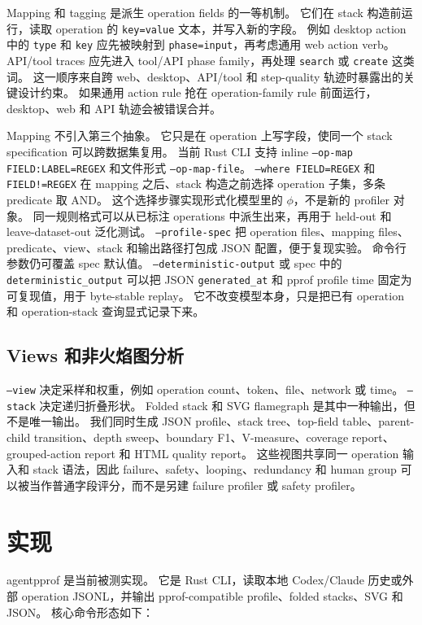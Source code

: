\documentclass[10pt,twocolumn]{ctexart}
\newcommand{\toolname}{agentpprof}
\begin{document}
Mapping 和 tagging 是派生 operation fields 的一等机制。
它们在 stack 构造前运行，读取 operation 的 \texttt{key=value} 文本，并写入新的字段。
例如 desktop action 中的 \texttt{type} 和 \texttt{key} 应先被映射到 \texttt{phase=input}，再考虑通用 web action verb。
API/tool traces 应先进入 tool/API phase family，再处理 \texttt{search} 或 \texttt{create} 这类词。
这一顺序来自跨 web、desktop、API/tool 和 step-quality 轨迹时暴露出的关键设计约束。
如果通用 action rule 抢在 operation-family rule 前面运行，desktop、web 和 API 轨迹会被错误合并。

Mapping 不引入第三个抽象。
它只是在 operation 上写字段，使同一个 stack specification 可以跨数据集复用。
当前 Rust CLI 支持 inline \texttt{--op-map FIELD:LABEL=REGEX} 和文件形式 \texttt{--op-map-file}。
\texttt{--where FIELD=REGEX} 和 \texttt{FIELD!=REGEX} 在 mapping 之后、stack 构造之前选择 operation 子集，多条 predicate 取 AND。
这个选择步骤实现形式化模型里的 $\phi$，不是新的 profiler 对象。
同一规则格式可以从已标注 operations 中派生出来，再用于 held-out 和 leave-dataset-out 泛化测试。
\texttt{--profile-spec} 把 operation files、mapping files、predicate、view、stack 和输出路径打包成 JSON 配置，便于复现实验。
命令行参数仍可覆盖 spec 默认值。
\texttt{--deterministic-output} 或 spec 中的 \texttt{deterministic\_output} 可以把 JSON \texttt{generated\_at} 和 pprof profile time 固定为可复现值，用于 byte-stable replay。
它不改变模型本身，只是把已有 operation 和 operation-stack 查询显式记录下来。

\subsection{Views 和非火焰图分析}

\texttt{--view} 决定采样和权重，例如 operation count、token、file、network 或 time。
\texttt{--stack} 决定递归折叠形状。
Folded stack 和 SVG flamegraph 是其中一种输出，但不是唯一输出。
我们同时生成 JSON profile、stack tree、top-field table、parent-child transition、depth sweep、boundary F1、V-measure、coverage report、grouped-action report 和 HTML quality report。
这些视图共享同一 operation 输入和 stack 语法，因此 failure、safety、looping、redundancy 和 human group 可以被当作普通字段评分，而不是另建 failure profiler 或 safety profiler。

\section{实现}

\toolname{} 是当前被测实现。
它是 Rust CLI，读取本地 Codex/Claude 历史或外部 operation JSONL，并输出 pprof-compatible profile、folded stacks、SVG 和 JSON。
核心命令形态如下：
\end{document}
